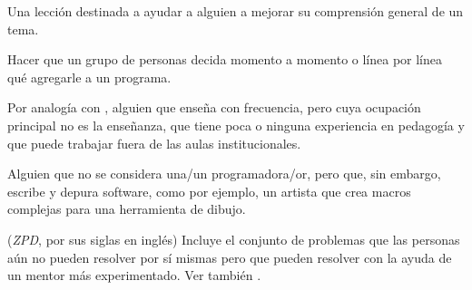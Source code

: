 \begin{description}
 Una lección destinada a ayudar a alguien a
mejorar su comprensión general de un tema.

 Hacer que un grupo de personas decida momento a momento
o línea por línea qué agregarle a un programa.

 Por analogía con
,
alguien que enseña con frecuencia, pero cuya ocupación principal no es la enseñanza,
que tiene poca o ninguna experiencia en pedagogía y que puede trabajar fuera de las aulas institucionales.

 Alguien que no se considera
una/un programadora/or, pero que, sin embargo, escribe y depura software, como por ejemplo, 
un artista que crea macros complejas para una herramienta de dibujo.

 (\emph{ZPD}, por sus siglas en inglés) Incluye el conjunto de problemas 
que las personas aún no pueden resolver por sí mismas pero que pueden resolver con la ayuda de un mentor más experimentado.  
Ver también .

\end{description}
